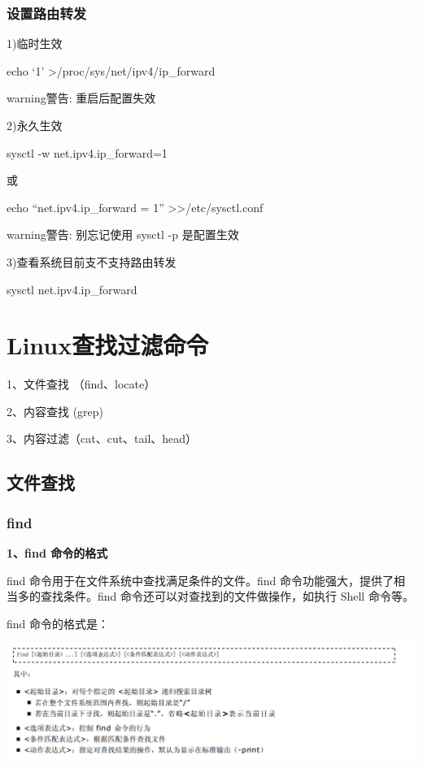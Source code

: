 \documentclass[letterpaper,10pt]{sphinxmanual}
\begin{document}
\subsubsection{设置路由转发}
\label{Linux_net/route:id6}
1)临时生效

echo `1' \textgreater{}/proc/sys/net/ipv4/ip\_forward

\begin{notice}{warning}{警告:}
重启后配置失效
\end{notice}

2)永久生效

sysctl -w net.ipv4.ip\_forward=1

或

echo ``net.ipv4.ip\_forward = 1'' \textgreater{}\textgreater{}/etc/sysctl.conf

\begin{notice}{warning}{警告:}
别忘记使用 sysctl -p 是配置生效
\end{notice}

3)查看系统目前支不支持路由转发

sysctl net.ipv4.ip\_forward


\section{Linux查找\textbar{}过滤命令}
\label{Linux_find/index::doc}\label{Linux_find/index:linux}
1、文件查找 （find、locate）

2、内容查找  (grep)

3、内容过滤（cat、cut、tail、head）


\subsection{文件查找}
\label{Linux_find/file::doc}\label{Linux_find/file:id1}

\subsubsection{find}
\label{Linux_find/file:find}
\textbf{1、find 命令的格式}

find 命令用于在文件系统中查找满足条件的文件。find 命令功能强大，提供了相当多的查找条件。find 命令还可以对查找到的文件做操作，如执行
Shell 命令等。

find 命令的格式是：

\includegraphics{findformat.png}
\end{document}
